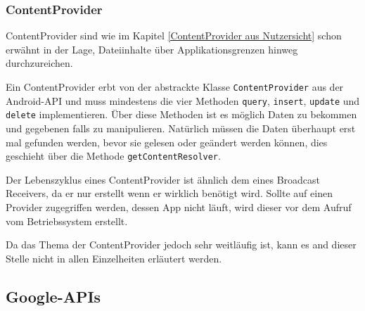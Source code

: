 \subsubsection{ContentProvider}
ContentProvider sind wie im Kapitel \ref{ContentProvider aus Nutzersicht} schon erw\"ahnt in der Lage, Dateiinhalte \"uber Applikationsgrenzen hinweg durchzureichen.

Ein ContentProvider erbt von der abstrackte Klasse \texttt{ContentProvider} aus der Android-API und muss mindestens die vier Methoden \texttt{query}, \texttt{insert}, \texttt{update} und \texttt{delete} implementieren. \"Uber diese Methoden ist es m\"oglich Daten zu bekommen und gegebenen falls zu manipulieren. Nat\"urlich m\"ussen die Daten \"uberhaupt erst mal gefunden werden, bevor sie gelesen oder ge\"andert werden k\"onnen, dies geschieht \"uber die Methode \texttt{getContentResolver}. \cite{Kuehn12}

Der Lebenszyklus eines ContentProvider ist \"ahnlich dem eines Broadcast Receivers, da er nur erstellt wenn er wirklich ben\"otigt wird. Sollte auf einen Provider zugegriffen werden, dessen App nicht l\"auft, wird dieser vor dem Aufruf vom Betriebssystem erstellt.

Da das Thema der ContentProvider jedoch sehr weitl\"aufig ist, kann es and dieser Stelle nicht in allen Einzelheiten erl\"autert werden. 

\subsection{Google-APIs} \label{Google-APIs}
\cite{GolemHBGoogleServices}